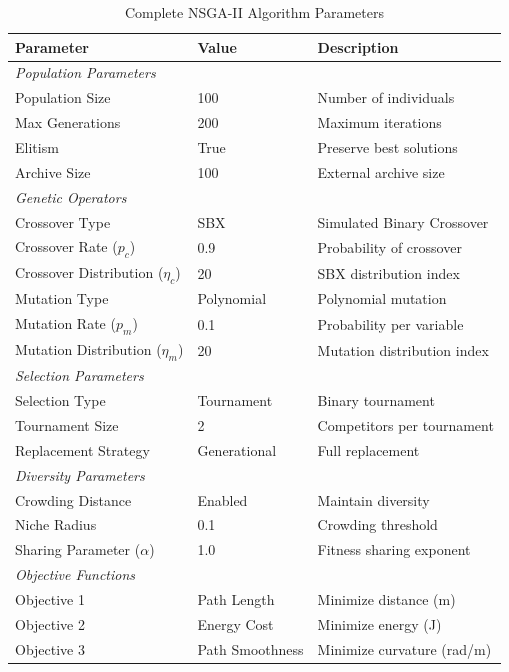 \begin{table}[htbp]
\centering
\caption{Complete NSGA-II Algorithm Parameters}
\label{tab:nsga2_params}
\begin{tabular}{@{}lll@{}}
\toprule
\textbf{Parameter} & \textbf{Value} & \textbf{Description} \\
\midrule
\multicolumn{3}{l}{\textit{Population Parameters}} \\
Population Size & 100 & Number of individuals \\
Max Generations & 200 & Maximum iterations \\
Elitism & True & Preserve best solutions \\
Archive Size & 100 & External archive size \\
\midrule
\multicolumn{3}{l}{\textit{Genetic Operators}} \\
Crossover Type & SBX & Simulated Binary Crossover \\
Crossover Rate ($p_c$) & 0.9 & Probability of crossover \\
Crossover Distribution ($\eta_c$) & 20 & SBX distribution index \\
Mutation Type & Polynomial & Polynomial mutation \\
Mutation Rate ($p_m$) & 0.1 & Probability per variable \\
Mutation Distribution ($\eta_m$) & 20 & Mutation distribution index \\
\midrule
\multicolumn{3}{l}{\textit{Selection Parameters}} \\
Selection Type & Tournament & Binary tournament \\
Tournament Size & 2 & Competitors per tournament \\
Replacement Strategy & Generational & Full replacement \\
\midrule
\multicolumn{3}{l}{\textit{Diversity Parameters}} \\
Crowding Distance & Enabled & Maintain diversity \\
Niche Radius & 0.1 & Crowding threshold \\
Sharing Parameter ($\alpha$) & 1.0 & Fitness sharing exponent \\
\midrule
\multicolumn{3}{l}{\textit{Objective Functions}} \\
Objective 1 & Path Length & Minimize distance (m) \\
Objective 2 & Energy Cost & Minimize energy (J) \\
Objective 3 & Path Smoothness & Minimize curvature (rad/m) \\

\end{tabular}
\end{table}
